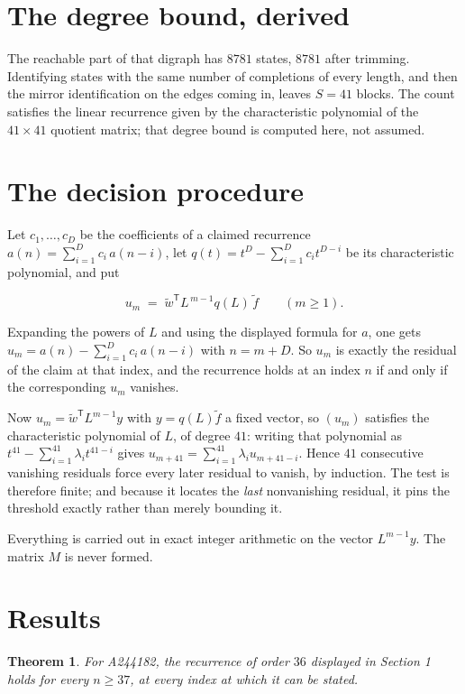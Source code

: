 \documentclass[11pt]{article}
\newtheorem{theorem}{Theorem}
\theoremstyle{definition}
\begin{document}
\section{The degree bound, derived}

The reachable part of that digraph has $8781$ states, $8781$ after trimming. Identifying states with the same number of completions of every length, and then the mirror identification on the edges coming in, leaves $S = 41$ blocks. The count satisfies the linear recurrence given by the characteristic polynomial of the $41\times41$ quotient matrix; that degree bound is computed here, not assumed.

\section{The decision procedure}

Let $c_1,\dots,c_D$ be the coefficients of a claimed recurrence $a(n) = \sum_{i=1}^{D} c_i\,a(n-i)$, let $q(t) = t^{D} - \sum_{i=1}^{D} c_i t^{D-i}$ be its characteristic polynomial, and put

\[u_m \;=\; \tilde w^{\mathsf T} L^{\,m-1} q(L)\,\tilde f \qquad (m \ge 1).\]

Expanding the powers of $L$ and using the displayed formula for $a$, one gets $u_m = a(n) - \sum_{i=1}^{D} c_i\,a(n-i)$ with $n = m + D$. So $u_m$ is exactly the residual of the claim at that index, and the recurrence holds at an index $n$ if and only if the corresponding $u_m$ vanishes.

Now $u_m = \tilde w^{\mathsf T} L^{m-1} y$ with $y = q(L)\tilde f$ a fixed vector, so $(u_m)$ satisfies the characteristic polynomial of $L$, of degree $41$: writing that polynomial as $t^{41} - \sum_{i=1}^{41} \lambda_i t^{41-i}$ gives $u_{m+41} = \sum_{i=1}^{41} \lambda_i u_{m+41-i}$. Hence $41$ consecutive vanishing residuals force every later residual to vanish, by induction. The test is therefore finite; and because it locates the {\itshape last} nonvanishing residual, it pins the threshold exactly rather than merely bounding it.

Everything is carried out in exact integer arithmetic on the vector $L^{m-1}y$. The matrix $M$ is never formed.

\section{Results}

\begin{theorem} For A244182, the recurrence of order $36$ displayed in Section 1 holds for every $n \ge 37$, at every index at which it can be stated.\end{theorem}
\end{document}
